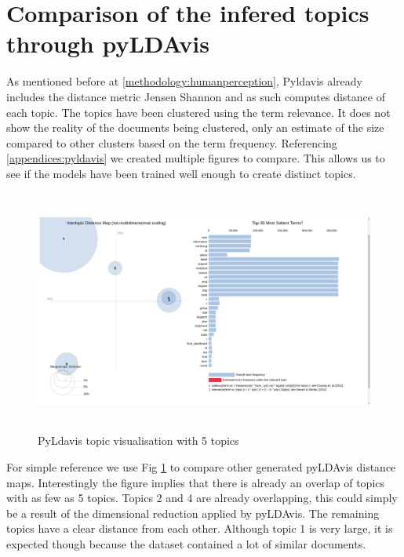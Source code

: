 \section{Comparison of the infered topics through pyLDAvis}\label{results:pyldavis}
As mentioned before at \ref{methodology:humanperception}, Pyldavis already includes the distance metric Jensen Shannon and as such computes distance of each topic. The topics have been clustered using the term relevance. It does not show the reality of the documents being clustered, only an estimate of the size compared to other clusters based on the term frequency. Referencing \ref{appendices:pyldavis} we created multiple figures to compare. This allows us to see if the models have been trained well enough to create distinct topics.

\begin{figure}[h]
    \centering
    \includegraphics[width=15cm, height=8cm,trim=0 0 100px 0, clip=true]{figures/pyldavis/pyldavis_5.png}
    \caption{PyLdavis topic visualisation with 5 topics}
    \label{fig:pyldavis_5}
\end{figure}

For simple reference we use Fig \ref{fig:pyldavis_5} to compare other generated pyLDAvis distance maps. Interestingly the figure implies that there is already an overlap of topics with as few as 5 topics. Topics 2 and 4 are already overlapping, this could simply be a result of the dimensional reduction applied by pyLDAvis. The remaining topics have a clear distance from each other. Although topic 1 is very large, it is expected though because the dataset contained a lot of similar documents.

